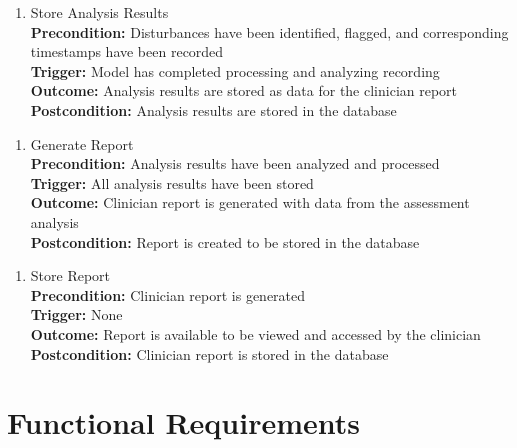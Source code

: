 \documentclass[12pt]{article}
\begin{document}
\begin{enumerate}[{PUC-}29. ]
  \item Store Analysis Results\\
  \textbf{Precondition: }Disturbances have been identified, flagged, and corresponding timestamps have been recorded\\
  \textbf{Trigger: }Model has completed processing and analyzing recording\\
  \textbf{Outcome: }Analysis results are stored as data for the clinician report\\
  \textbf{Postcondition: }Analysis results are stored in the database\\
\end{enumerate}

\begin{enumerate}[{PUC-}30. ]
  \item Generate Report\\
  \textbf{Precondition: }Analysis results have been analyzed and processed\\
  \textbf{Trigger: }All analysis results have been stored\\
  \textbf{Outcome: }Clinician report is generated with data from the assessment analysis\\
  \textbf{Postcondition: }Report is created to be stored in the database\\
\end{enumerate}

\begin{enumerate}[{PUC-}31. ]
  \item Store Report\\
  \textbf{Precondition: }Clinician report is generated\\
  \textbf{Trigger: }None\\
  \textbf{Outcome: }Report is available to be viewed and accessed by the clinician\\
  \textbf{Postcondition: }Clinician report is stored in the database\\
\end{enumerate}


\section{Functional Requirements}
\end{document}
